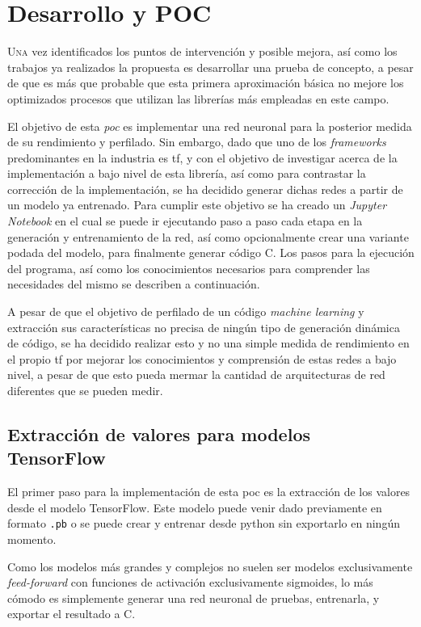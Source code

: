 \chapter{Desarrollo y POC}
\label{chap:desarrollo_poc}

\lettrine{U}{na} vez identificados los puntos de intervención y posible mejora, así como los trabajos ya realizados la propuesta es desarrollar una prueba de concepto, a pesar de que es más que probable que esta primera aproximación básica no mejore los optimizados procesos que utilizan las librerías más empleadas en este campo.

El objetivo de esta \textit{\acrlong{poc}} es implementar una red neuronal para la posterior medida de su rendimiento y perfilado. Sin embargo, dado que uno de los \textit{frameworks} predominantes en la industria es \acrlong{tf}, y con el objetivo de investigar acerca de la implementación a bajo nivel de esta librería, así como para contrastar la corrección de la implementación, se ha decidido generar dichas redes a partir de un modelo ya entrenado. Para cumplir este objetivo se ha creado un \textit{Jupyter Notebook} en el cual se puede ir ejecutando paso a paso cada etapa en la generación y entrenamiento de la red, así como opcionalmente crear una variante podada del modelo, para finalmente generar código C. Los pasos para la ejecución del programa, así como los conocimientos necesarios para comprender las necesidades del mismo se describen a continuación.

A pesar de que el objetivo de perfilado de un código \textit{machine learning} y extracción sus características no precisa de ningún tipo de generación dinámica de código, se ha decidido realizar esto y no una simple medida de rendimiento en el propio \acrlong{tf} por mejorar los conocimientos y comprensión de estas redes a bajo nivel, a pesar de que esto pueda mermar la cantidad de arquitecturas de red diferentes que se pueden medir.

\section{Extracción de valores para modelos TensorFlow}
\label{sec:extraccion_valores_modelo_tf}
El primer paso para la implementación de esta \acrshort{poc} es la extracción de los valores desde el modelo TensorFlow. Este modelo puede venir dado previamente en formato \texttt{.pb} o se puede crear y entrenar desde python sin exportarlo en ningún momento.

Como los modelos más grandes y complejos no suelen ser modelos exclusivamente \textit{feed-forward} con funciones de activación exclusivamente sigmoides, lo más cómodo es simplemente generar una red neuronal de pruebas, entrenarla, y exportar el resultado a C.

